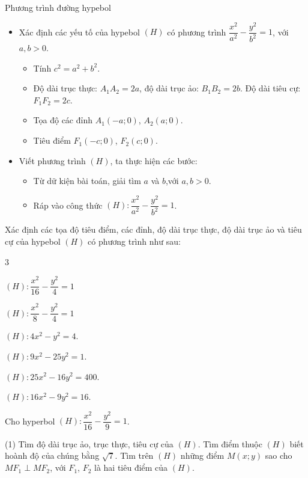 \begin{dang}{Phương trình đường hypebol}
	\begin{itemize}
		\item [\iconMT] Xác định các yếu tố của hypebol $(H)$ có phương trình $\dfrac{x^2}{a^2}-\dfrac{y^2}{b^2}=1$, với $a,b>0$.
		\begin{itemize}
			\item Tính $c^2 = a^2 + b^2$.
			\item Độ dài trục thực: $A_1 A_2 = 2a$, độ dài trục ảo: $B_1 B_2 = 2b$. Độ dài tiêu cự: $F_1 F_2 = 2c$.
			\item Tọa độ các đỉnh $A_1(-a;0)$, $A_2(a;0)$.
			\item Tiêu điểm $F_1(-c;0)$,  $F_2(c;0)$.
		\end{itemize}
		\item [\iconMT] Viết phương trình $(H)$, ta thực hiện các bước:
		\begin{itemize}
			\item Từ dữ kiện bài toán, giải tìm $a$ và $b$,với $a, b>0$. 
			\item Ráp vào công thức $(H): \dfrac{x^{2}}{a^{2}}-\dfrac{y^{2}}{b^{2}}=1$.
		\end{itemize}
	\end{itemize}
\end{dang}

\begin{vd}
	Xác định các tọa độ tiêu điểm, các đỉnh, độ dài trục thực, độ dài trục ảo và tiêu cự của hypebol $(H)$ có phương trình như sau:
	\begin{enumEX}[a)]{3}
		\item $(H): \dfrac{x^2}{16}-\dfrac{y^2}{4}=1$
		\item $(H): \dfrac{x^2}{8}-\dfrac{y^2}{4}=1$
		\item $(H): 4x^2-y^2=4$.
		\item $(H): 9x^2-25y^2=1$.
		\item $(H): 25x^2-16y^2=400$.
		\item $(H): 16x^2-9y^2=16$.
	\end{enumEX}
	\loigiai{}
\end{vd}

\begin{vd}
	Cho hyperbol $(H): \dfrac{x^2}{16}-\dfrac{y^2}{9}=1$.
	\begin{tasks}(1)
		\task Tìm độ dài trục ảo, trục thực, tiêu cự của $(H)$.
		\task Tìm điểm thuộc $(H)$ biết hoành độ của chúng bằng $\sqrt{7}$.
		\task Tìm trên $(H)$ những điểm $M(x;y)$ sao cho $MF_1 \perp MF_2$, với $F_1$, $F_2$ là hai tiêu điểm của $(H)$.
	\end{tasks}
	\loigiai{}
\end{vd}

